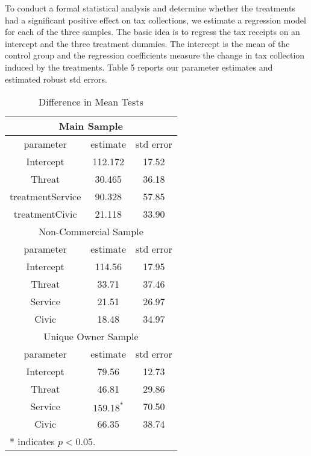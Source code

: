 \documentclass[12pt,titlepage]{article}
\begin{document}
To conduct a formal statistical analysis and determine whether the treatments 
had a significant positive effect on tax collections, we estimate a regression model 
for each of the three samples. The basic idea is to  regress the tax receipts on an intercept 
and the three treatment dummies. The intercept is the mean of the control group and the 
regression coefficients measure the change in tax collection induced by the treatments.
Table 5 reports our parameter estimates and estimated robust std errors.

\begin{table}
\caption{Difference in Mean Tests}\label{dif_mean}
\begin{center}
\begin{tabular}{|c|c|c|}
\hline
\multicolumn{3}{|c|}{Main Sample} \\
\hline
parameter & estimate & std error \\
\hline
Intercept&  112.172 & 17.52 \\
Threat & 30.465  & 36.18 \\
treatmentService & 90.328 & 57.85 \\ 
treatmentCivic & 21.118 & 33.90 \\
\hline
\multicolumn{3}{|c|}{Non-Commercial Sample} \\
\hline
parameter & estimate & std error \\
\hline
Intercept & 114.56 & 17.95 \\
Threat & 33.71 &  37.46 \\
Service & 21.51 &  26.97 \\
Civic & 18.48 & 34.97 \\
\hline
\multicolumn{3}{|c|}{Unique Owner Sample} \\
\hline
parameter & estimate & std error \\
\hline
Intercept &  79.56 &  12.73  \\
Threat & 46.81 &  29.86 \\ 
Service & $159.18^{*}$ & 70.50 \\ 
Civic  & 66.35 &  38.74 \\
\hline
\multicolumn{3}{|l|}{* indicates $p<0.05$.} \\
\hline
\end{tabular}
\end{center}
\end{table}
\end{document}
